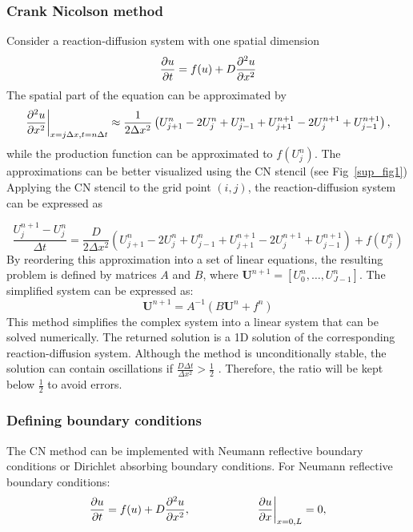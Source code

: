 \subsubsection*{Crank Nicolson method}\label{cranknicolson}
Consider a reaction-diffusion system with one spatial dimension
\begin{equation}
    \frac{\partial u}{\partial t} =  f(u) + D\frac{\partial^{2} {u}}{\partial {x}^{2}}
\end{equation}
The spatial part of the equation can be approximated by
\begin{equation}
    \frac{\partial^{2} {u}}{\partial {x}^{2}} \biggr\rvert_{x=j\Delta x,t=n\Delta t} \approx \frac{1}{2\Delta x^{2}}\left( U^{n}_{j+1} -  2U^{n}_{j} + U^{n}_{j-1} + U^{n+1}_{j+1} - 2U^{n+1}_{j} + U^{n+1}_{j-1}\right),
\end{equation}
while the production function can be approximated to $f ( U^{n}_{j})$. The approximations can be better visualized using the CN stencil (see Fig~\ref{sup_fig1})
Applying the CN stencil to the grid point $(i, j)$, the reaction-diffusion system can be expressed as

\begin{equation}
    \frac{U^{n+1}_{j} - U^{n}_{j}}{\Delta t} = \frac{D}{2\Delta x^{2}}\left( U^{n}_{j+1} -  2U^{n}_{j} + U^{n}_{j-1} + U^{n+1}_{j+1} - 2U^{n+1}_{j} + U^{n+1}_{j-1}\right) +  f( U^{n}_{j})
    \label{CN_stencil}
\end{equation}
By reordering this approximation into a set of linear equations, the resulting problem is defined by matrices $A$ and $B$, where $\textbf{U}^{n+1} = [U^{n}_{0}, \ldots , U^{n}_{J-1}]$. The simplified system can be expressed as:
\begin{equation}
    \textbf{U}^{n+1} = A^{-1}(B\textbf{U}^{n} + f^{n})
\end{equation}
This method simplifies the complex system into a linear system that can be solved numerically. The returned solution is a 1D solution of the corresponding reaction-diffusion system. Although the method is unconditionally stable, the solution can contain oscillations if $ \frac{D\Delta t}{\Delta x^{2}} >\frac{1}{2} $ \parencite{trefethen1996finite}. Therefore, the ratio will be kept below $\frac{1}{2}$ to avoid errors.

\subsubsection*{Defining boundary conditions}\label{methods_boundary_conditions_CN}
The CN method can be implemented with Neumann reflective boundary conditions or Dirichlet absorbing boundary conditions.
For Neumann reflective boundary conditions:
\begin{equation}
    \frac{\partial u}{\partial t} =  f(u) + D\frac{\partial^{2} {u}}{\partial {x}^{2}},   \quad \quad \quad \quad \quad \quad \pdv{u}{x}\biggr\rvert_{x=0,L}=0,
\end{equation}

